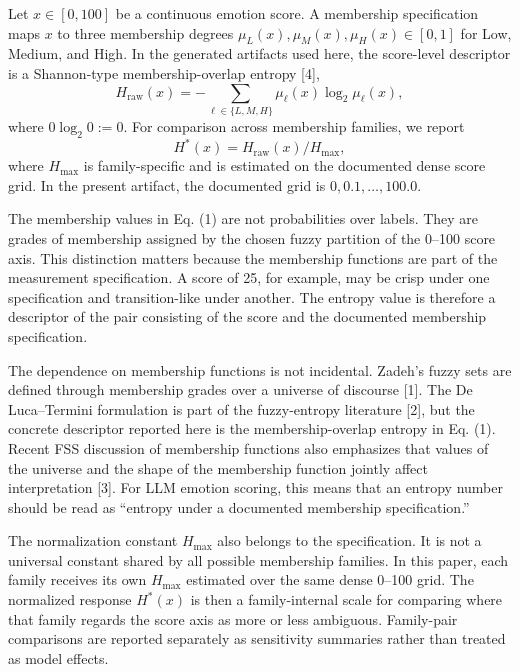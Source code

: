 \documentclass[a4paper,10pt,twocolumn]{myjarticle2}
\newcommand{\Hraw}{H_{\mathrm{raw}}}
\newcommand{\Hstar}{H^{\ast}}
\begin{document}
Let $x \in [0,100]$ be a continuous emotion score. A membership specification
maps $x$ to three membership degrees
$\mu_L(x), \mu_M(x), \mu_H(x) \in [0,1]$ for Low, Medium, and High. In the
generated artifacts used here, the score-level descriptor is a Shannon-type
membership-overlap entropy [4],
\begin{equation}
\Hraw(x)=-\sum_{\ell \in \{L,M,H\}}\mu_\ell(x)\log_2\mu_\ell(x),
\end{equation}
where $0\log_2 0:=0$. For comparison across membership families, we report
\begin{equation}
\Hstar(x) = \Hraw(x) / H_{\max},
\end{equation}
where $H_{\max}$ is family-specific and is estimated on the documented dense
score grid. In the present artifact, the documented grid is
$0, 0.1, \ldots, 100.0$.

The membership values in Eq. (1) are not probabilities over labels. They are
grades of membership assigned by the chosen fuzzy partition of the 0--100
score axis. This distinction matters because the membership functions are part
of the measurement specification. A score of 25, for example, may be crisp
under one specification and transition-like under another. The entropy value is
therefore a descriptor of the pair consisting of the score and the documented
membership specification.

The dependence on membership functions is not incidental. Zadeh's fuzzy sets
are defined through membership grades over a universe of discourse [1]. The
De Luca--Termini formulation is part of the fuzzy-entropy literature [2], but
the concrete descriptor reported here is the membership-overlap entropy in
Eq. (1). Recent FSS discussion of membership functions also emphasizes that
values of the universe and the shape of the membership function jointly affect
interpretation [3]. For LLM emotion scoring, this means that an entropy number
should be read as ``entropy under a documented membership specification.''

The normalization constant $H_{\max}$ also belongs to the specification. It is
not a universal constant shared by all possible membership families. In this
paper, each family receives its own $H_{\max}$ estimated over the same dense
0--100 grid. The normalized response $\Hstar(x)$ is then a family-internal
scale for comparing where that family regards the score axis as more or less
ambiguous. Family-pair comparisons are reported separately as sensitivity
summaries rather than treated as model effects.
\end{document}
